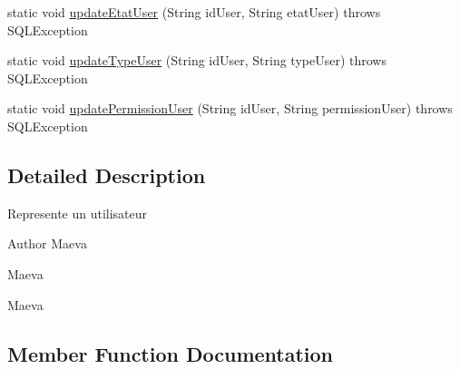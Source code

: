 \begin{DoxyCompactItemize}
\item 
static void \hyperlink{classcom_1_1ecetech_1_1bti4_1_1itproject_1_1classified_1_1dao_1_1_user_d_a_o_a0b85d1ba7afb073a78a1dddfe5f8fb78}{update\+Etat\+User} (String id\+User, String etat\+User)  throws S\+Q\+L\+Exception 
\item 
static void \hyperlink{classcom_1_1ecetech_1_1bti4_1_1itproject_1_1classified_1_1dao_1_1_user_d_a_o_a467d8282b64e46b984dbfe6b2d3a9a2d}{update\+Type\+User} (String id\+User, String type\+User)  throws S\+Q\+L\+Exception 
\item 
static void \hyperlink{classcom_1_1ecetech_1_1bti4_1_1itproject_1_1classified_1_1dao_1_1_user_d_a_o_a5ce44e58df6e6c26b0df8d0d161ab9c2}{update\+Permission\+User} (String id\+User, String permission\+User)  throws S\+Q\+L\+Exception 
\end{DoxyCompactItemize}


\subsection{Detailed Description}
Represente un utilisateur \begin{DoxyAuthor}{Author}
Maeva 

Maeva 

Maeva 
\end{DoxyAuthor}


\subsection{Member Function Documentation}
